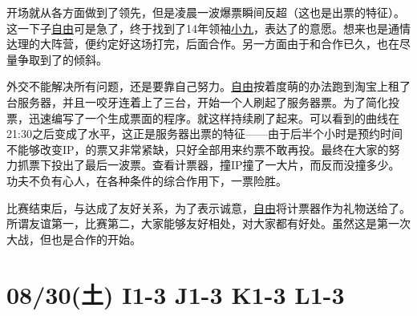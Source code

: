 开场就从各方面做到了领先，但是凌晨一波爆票瞬间反超（这也是出票的特征）。这一下子\uline{自由}可是急了，终于找到了14年领袖\uline{小九}，表达了的意愿。想来也是通情达理的大阵营，便约定好这场打完，后面合作。另一方面由于和合作已久，也在尽量争取到了的倾斜。

外交不能解决所有问题，还是要靠自己努力。\uline{自由}按着度萌的办法跑到淘宝上租了台服务器，并且一咬牙连着上了三台，开始一个人刷起了服务器票。为了简化投票，迅速编写了一个生成票面的程序。就这样持续刷了起来。可以看到的曲线在21:30之后变成了水平，这正是服务器出票的特征——由于后半个小时是预约时间不能够改变IP，的票又非常紧缺，只好全部用来约票不敢再投。最终在大家的努力抓票下投出了最后一波票。查看计票器，撞IP撞了一大片，而反而没撞多少。功夫不负有心人，在各种条件的综合作用下，一票险胜。

比赛结束后，与达成了友好关系，为了表示诚意，\uline{自由}将计票器作为礼物送给了。所谓友谊第一，比赛第二，大家能够友好相处，对大家都有好处。虽然这是第一次大战，但也是合作的开始。

\section{08/30(土) I1-3 J1-3 K1-3 L1-3}


